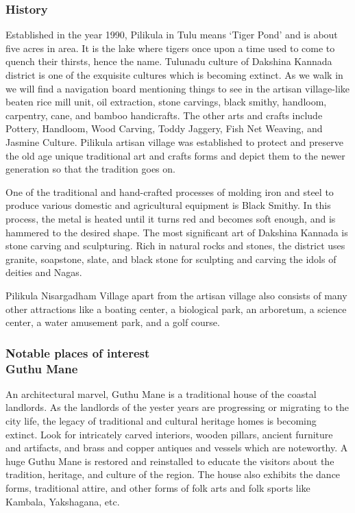 \documentclass[12pt]{article}
\begin{document}
	\subsubsection{History}
	\par Established in the year 1990, Pilikula in Tulu means ‘Tiger Pond’ and is about five acres in area. It is the lake where tigers once upon a time used to come to quench their thirsts, hence the name. Tulunadu culture of Dakshina Kannada district is one of the exquisite cultures which is becoming extinct. As we walk in we will find a navigation board mentioning things to see in the artisan village-like beaten rice mill unit, oil extraction, stone carvings, black smithy, handloom, carpentry, cane, and bamboo handicrafts. The other arts and crafts include Pottery, Handloom, Wood Carving, Toddy Jaggery, Fish Net Weaving, and Jasmine Culture. Pilikula artisan village was established to protect and preserve the old age unique traditional art and crafts forms and depict them to the newer generation so that the tradition goes on. \\

	\par One of the traditional and hand-crafted processes of molding iron and steel to produce various domestic and agricultural equipment is Black Smithy. In this process, the metal is heated until it turns red and becomes soft enough, and is hammered to the desired shape.
	The most significant art of Dakshina Kannada is stone carving and sculpturing. Rich in natural rocks and stones, the district uses granite, soapstone, slate, and black stone for sculpting and carving the idols of deities and Nagas. \\

	\par  Pilikula Nisargadham Village apart from the artisan village also consists of many other attractions like a boating center, a biological park, an arboretum, a science center, a water amusement park, and a golf course.

	\subsubsection{Notable places of interest \\ Guthu Mane}
	\par An architectural marvel, Guthu Mane is a traditional house of the coastal landlords. As the landlords of the yester years are progressing or migrating to the city life, the legacy of traditional and cultural heritage homes is becoming extinct. Look for intricately carved interiors, wooden pillars, ancient furniture and artifacts, and brass and copper antiques and vessels which are noteworthy. A huge Guthu Mane is restored and reinstalled to educate the visitors about the tradition, heritage, and culture of the region. The house also exhibits the dance forms, traditional attire, and other forms of folk arts and folk sports like Kambala, Yakshagana, etc. \\
\end{document}
